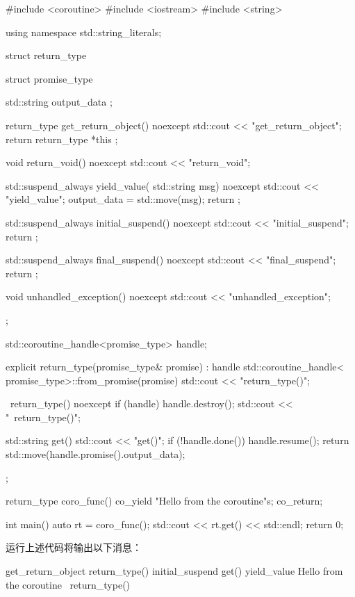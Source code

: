 \begin{cpp}
#include <coroutine>
#include <iostream>
#include <string>

using namespace std::string_literals;

struct return_type {
    struct promise_type {
        std::string output_data { };

        return_type get_return_object() noexcept {
            std::cout << "get_return_object\n";
            return return_type{ *this };
        }

        void return_void() noexcept {
            std::cout << "return_void\n";
        }

        std::suspend_always yield_value(
        std::string msg) noexcept {
            std::cout << "yield_value\n";
            output_data = std::move(msg);
            return {};
        }

        std::suspend_always initial_suspend() noexcept {
            std::cout << "initial_suspend\n";
            return {};
        }

        std::suspend_always final_suspend() noexcept {
            std::cout << "final_suspend\n";
            return {};
        }

        void unhandled_exception() noexcept {
            std::cout << "unhandled_exception\n";
        }
    };

    std::coroutine_handle<promise_type> handle{};

    explicit return_type(promise_type& promise)
        : handle{ std::coroutine_handle<
                  promise_type>::from_promise(promise)}{
        std::cout << "return_type()\n";
    }

    ~return_type() noexcept {
        if (handle) {
            handle.destroy();
        }
        std::cout << "~return_type()\n";
    }

    std::string get() {
        std::cout << "get()\n";
        if (!handle.done()) {
            handle.resume();
        }
        return std::move(handle.promise().output_data);
    }
};

return_type coro_func() {
    co_yield "Hello from the coroutine\n"s;
    co_return;
}

int main() {
    auto rt = coro_func();
    std::cout << rt.get() << std::endl;
    return 0;
}
\end{cpp}

运行上述代码将输出以下消息：

\begin{shell}
get_return_object
return_type()
initial_suspend
get()
yield_value
Hello from the coroutine
~return_type()
\end{shell}

